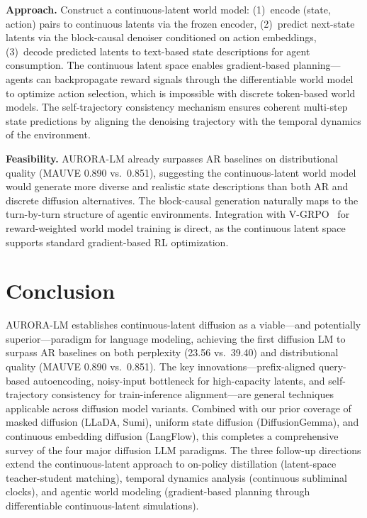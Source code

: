 \documentclass[11pt,a4paper]{article}
\begin{document}
\textbf{Approach.} Construct a continuous-latent world model: (1)~encode (state, action) pairs to continuous latents via the frozen encoder, (2)~predict next-state latents via the block-causal denoiser conditioned on action embeddings, (3)~decode predicted latents to text-based state descriptions for agent consumption. The continuous latent space enables gradient-based planning---agents can backpropagate reward signals through the differentiable world model to optimize action selection, which is impossible with discrete token-based world models. The self-trajectory consistency mechanism ensures coherent multi-step state predictions by aligning the denoising trajectory with the temporal dynamics of the environment.

\textbf{Feasibility.} AURORA-LM already surpasses AR baselines on distributional quality (MAUVE 0.890 vs.\ 0.851), suggesting the continuous-latent world model would generate more diverse and realistic state descriptions than both AR and discrete diffusion alternatives. The block-causal generation naturally maps to the turn-by-turn structure of agentic environments. Integration with V-GRPO~\cite{vgrpo2026} for reward-weighted world model training is direct, as the continuous latent space supports standard gradient-based RL optimization.

\section{Conclusion}
AURORA-LM establishes continuous-latent diffusion as a viable---and potentially superior---paradigm for language modeling, achieving the first diffusion LM to surpass AR baselines on both perplexity (23.56 vs.\ 39.40) and distributional quality (MAUVE 0.890 vs.\ 0.851). The key innovations---prefix-aligned query-based autoencoding, noisy-input bottleneck for high-capacity latents, and self-trajectory consistency for train-inference alignment---are general techniques applicable across diffusion model variants. Combined with our prior coverage of masked diffusion (LLaDA, Sumi), uniform state diffusion (DiffusionGemma), and continuous embedding diffusion (LangFlow), this completes a comprehensive survey of the four major diffusion LLM paradigms. The three follow-up directions extend the continuous-latent approach to on-policy distillation (latent-space teacher-student matching), temporal dynamics analysis (continuous subliminal clocks), and agentic world modeling (gradient-based planning through differentiable continuous-latent simulations).
\end{document}
